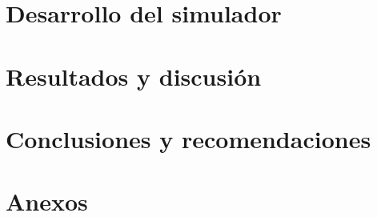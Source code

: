 \documentclass[12pt,openany]{MIA-USA}
\begin{document}
    \chapter{Desarrollo del simulador}
    \label{cap:desarrollo}
    
    
    \chapter{Resultados y discusi\'on}
    \label{cap:resultados}
    
    
    \chapter{Conclusiones y recomendaciones}
    \label{cap:conclusiones}
    
    
    
    \chapter*{Anexos}
    

    
    
 	
\end{document}
